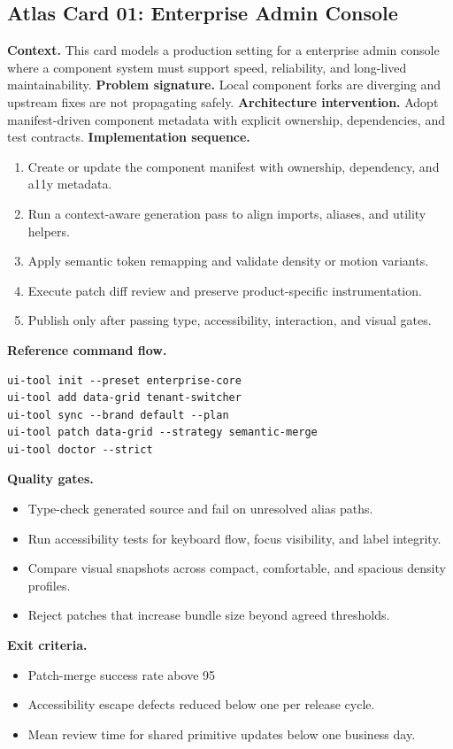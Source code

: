 \clearpage
\subsection*{Atlas Card 01: Enterprise Admin Console}
\textbf{Context.} This card models a production setting for a enterprise admin console where a component system must support speed, reliability, and long-lived maintainability.
\textbf{Problem signature.} Local component forks are diverging and upstream fixes are not propagating safely.
\textbf{Architecture intervention.} Adopt manifest-driven component metadata with explicit ownership, dependencies, and test contracts.
\textbf{Implementation sequence.}
\begin{enumerate}[leftmargin=*, itemsep=0.28em]
  \item Create or update the component manifest with ownership, dependency, and a11y metadata.
  \item Run a context-aware generation pass to align imports, aliases, and utility helpers.
  \item Apply semantic token remapping and validate density or motion variants.
  \item Execute patch diff review and preserve product-specific instrumentation.
  \item Publish only after passing type, accessibility, interaction, and visual gates.
\end{enumerate}
\textbf{Reference command flow.}
\begin{verbatim}
ui-tool init --preset enterprise-core
ui-tool add data-grid tenant-switcher
ui-tool sync --brand default --plan
ui-tool patch data-grid --strategy semantic-merge
ui-tool doctor --strict
\end{verbatim}
\textbf{Quality gates.}
\begin{itemize}[leftmargin=*, itemsep=0.24em]
  \item Type-check generated source and fail on unresolved alias paths.
  \item Run accessibility tests for keyboard flow, focus visibility, and label integrity.
  \item Compare visual snapshots across compact, comfortable, and spacious density profiles.
  \item Reject patches that increase bundle size beyond agreed thresholds.
\end{itemize}
\textbf{Exit criteria.}
\begin{itemize}[leftmargin=*, itemsep=0.24em]
  \item Patch-merge success rate above 95%
  \item Accessibility escape defects reduced below one per release cycle.
  \item Mean review time for shared primitive updates below one business day.
\end{itemize}
\clearpage
